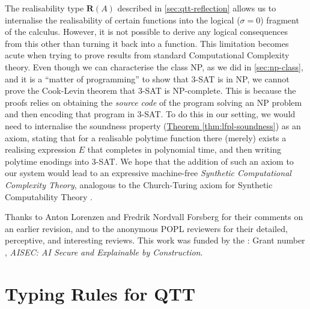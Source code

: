 \documentclass[acmsmall,screen]{acmart}
\newcommand{\thmref}[1]{\hyperref[#1]{Theorem \ref*{#1}}}
\begin{document}
The realisability type $\mathbf{R}(A)$ described in
\autoref{sec:qtt-reflection} allows us to internalise the
realisability of certain functions into the logical ($\sigma = 0$)
fragment of the calculus. However, it is not possible to derive any
logical consequences from this other than turning it back into a
function. This limitation becomes acute when trying to prove results
from standard Computational Complexity theory. Even though we can
characterise the class NP, as we did in \autoref{sec:np-class}, and it
is a ``matter of programming'' to show that 3-SAT is in NP, we cannot
prove the Cook-Levin theorem that 3-SAT is NP-complete. This is
because the proofs relies on obtaining the \emph{source code} of the
program solving an NP problem and then encoding that program in
3-SAT. To do this in our setting, we would need to internalise the
soundness property (\thmref{thm:lfpl-soundness}) as an axiom, stating
that for a realisable polytime function there (merely) exists a
realising expression $E$ that completes in polynomial time, and then
writing polytime enodings into 3-SAT. We hope that the addition of
such an axiom to our system would lead to an expressive machine-free
\emph{Synthetic Computational Complexity Theory}, analogous to the
Church-Turing axiom for Synthetic Computability Theory \cite{Bauer06}.

\begin{acks}
  Thanks to Anton Lorenzen and Fredrik Nordvall Forsberg for their
  comments on an earlier revision, and to the anonymous POPL reviewers
  for their detailed, perceptive, and interesting reviews. This work
  was funded by the : Grant number
  , \emph{AISEC: AI Secure and
    Explainable by Construction}.
\end{acks}




\appendix

\section{Typing Rules for QTT}
\end{document}
